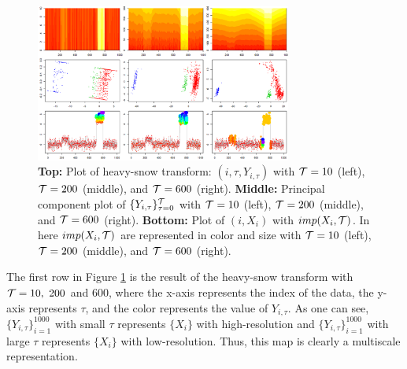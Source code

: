\documentclass[preprint, review, 12pt]{article}
\theoremstyle{definition}
\theoremstyle{remark}
\begin{document}
\begin{figure}
	\centering
	\includegraphics[width=0.75\textwidth]{Fig/snow_ex1_fig2.png}
	\caption{\textbf{Top:} Plot of heavy-snow transform: $(i,\tau,Y_{i,\tau})$ with ${\cal T}=10$ (left), ${\cal T}=200$ (middle), and ${\cal T}=600$ (right). 
		\newline
		\textbf{Middle:} Principal component plot of $\{Y_{i,\tau}\}_{\tau=0}^{\cal T}$ with ${\cal T}=10$ (left), ${\cal T}=200$ (middle), and ${\cal T}=600$ (right).
		\newline
		\textbf{Bottom:} Plot of $(i,X_{i})$ with $imp(X_i,{\cal T})$. In here $imp(X_i,{\cal T})$ are represented in color and size with ${\cal T}=10$ (left), ${\cal T}=200$ (middle),  and ${\cal T}=600$ (right).}
	\label{snow:ex1_2}
\end{figure}


The first row in Figure \ref{snow:ex1_2} is the result of the heavy-snow transform with ${\cal T}=10,~200$ and $600$, where the x-axis represents the index of the data, the y-axis represents $\tau$, and the color represents the value of $Y_{i,\tau}$. As one can see, $\{Y_{i,\tau}\}_{i=1}^{1000}$ with small $\tau$ represents $\{X_i\}$ with high-resolution and $\{Y_{i,\tau}\}_{i=1}^{1000}$ with large $\tau$ represents $\{X_i\}$ with low-resolution. Thus, this map is clearly a multiscale representation. 
\end{document}
